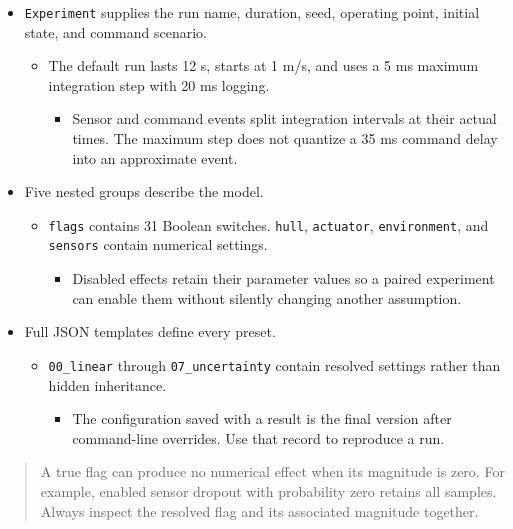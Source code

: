 \documentclass[10pt,letterpaper]{article}
\newenvironment{reportnote}{\begin{quote}\small\color{navy}}{\end{quote}}
\begin{document}
\begin{itemize}
\item
  \texttt{Experiment} supplies the run name, duration, seed, operating point, initial state, and command scenario.

  \begin{itemize}
  \item
    The default run lasts 12 s, starts at 1 m/s, and uses a 5 ms maximum integration step with 20 ms logging.

    \begin{itemize}
    \item
      Sensor and command events split integration intervals at their actual times. The maximum step does not quantize a 35 ms command delay into an approximate event.
    \end{itemize}
  \end{itemize}
\item
  Five nested groups describe the model.

  \begin{itemize}
  \item
    \texttt{flags} contains 31 Boolean switches. \texttt{hull}, \texttt{actuator}, \texttt{environment}, and \texttt{sensors} contain numerical settings.

    \begin{itemize}
    \item
      Disabled effects retain their parameter values so a paired experiment can enable them without silently changing another assumption.
    \end{itemize}
  \end{itemize}
\item
  Full JSON templates define every preset.

  \begin{itemize}
  \item
    \texttt{00\_linear} through \texttt{07\_uncertainty} contain resolved settings rather than hidden inheritance.

    \begin{itemize}
    \item
      The configuration saved with a result is the final version after command-line overrides. Use that record to reproduce a run.
    \end{itemize}
  \end{itemize}
\end{itemize}

\begin{reportnote}

A true flag can produce no numerical effect when its magnitude is zero. For example, enabled sensor dropout with probability zero retains all samples. Always inspect the resolved flag and its associated magnitude together.

\end{reportnote}
\end{document}
